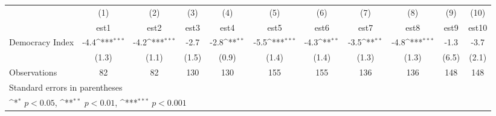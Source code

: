 {
\def\sym#1{\ifmmode^{#1}\else\(^{#1}\)\fi}
\begin{tabular}{l*{10}{c}}
\hline\hline
                    &\multicolumn{1}{c}{(1)}         &\multicolumn{1}{c}{(2)}         &\multicolumn{1}{c}{(3)}         &\multicolumn{1}{c}{(4)}         &\multicolumn{1}{c}{(5)}         &\multicolumn{1}{c}{(6)}         &\multicolumn{1}{c}{(7)}         &\multicolumn{1}{c}{(8)}         &\multicolumn{1}{c}{(9)}         &\multicolumn{1}{c}{(10)}         \\
                    &        est1         &        est2         &        est3         &        est4         &        est5         &        est6         &        est7         &        est8         &        est9         &       est10         \\
\hline
Democracy Index     &        -4.4\sym{***}&        -4.2\sym{***}&        -2.7         &        -2.8\sym{**} &        -5.5\sym{***}&        -4.3\sym{**} &        -3.5\sym{**} &        -4.8\sym{***}&        -1.3         &        -3.7         \\
                    &       (1.3)         &       (1.1)         &       (1.5)         &       (0.9)         &       (1.4)         &       (1.4)         &       (1.3)         &       (1.3)         &       (6.5)         &       (2.1)         \\
\hline
Observations        &          82         &          82         &         130         &         130         &         155         &         155         &         136         &         136         &         148         &         148         \\
\hline\hline
\multicolumn{11}{l}{\footnotesize Standard errors in parentheses}\\
\multicolumn{11}{l}{\footnotesize \sym{*} \(p<0.05\), \sym{**} \(p<0.01\), \sym{***} \(p<0.001\)}\\
\end{tabular}
}
